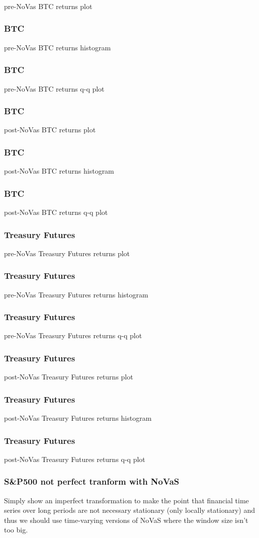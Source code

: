 \documentclass{beamer}
\begin{document}
\begin{frame}
\frametitle{}
pre-NoVas BTC returns plot
\end{frame}

\begin{frame}
\frametitle{BTC}
pre-NoVas BTC returns histogram
\end{frame}

\begin{frame}
\frametitle{BTC}
pre-NoVas BTC returns q-q plot
\end{frame}

\begin{frame}
\frametitle{BTC}
post-NoVas BTC returns plot
\end{frame}

\begin{frame}
\frametitle{BTC}
post-NoVas BTC returns histogram
\end{frame}

\begin{frame}
\frametitle{BTC}
post-NoVas BTC returns q-q plot
\end{frame}

\begin{frame}
\frametitle{Treasury Futures}
pre-NoVas Treasury Futures returns plot
\end{frame}

\begin{frame}
\frametitle{Treasury Futures}
pre-NoVas Treasury Futures returns histogram
\end{frame}

\begin{frame}
\frametitle{Treasury Futures}
pre-NoVas Treasury Futures returns q-q plot
\end{frame}

\begin{frame}
\frametitle{Treasury Futures}
post-NoVas Treasury Futures returns plot
\end{frame}

\begin{frame}
\frametitle{Treasury Futures}
post-NoVas Treasury Futures returns histogram
\end{frame}

\begin{frame}
\frametitle{Treasury Futures}
post-NoVas Treasury Futures returns q-q plot
\end{frame}

\begin{frame}
\frametitle{S&P500 not perfect tranform with NoVaS}
Simply show an imperfect transformation to make the point that financial time series over long periods are not necessary stationary (only locally stationary) and thus we should use time-varying versions of NoVaS where the window size isn't too big.
\end{frame}
\end{document}
